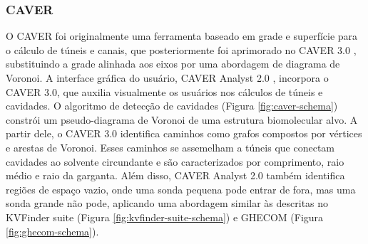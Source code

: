 \documentclass[Portugues]{phdquali}
\begin{document}
\subsubsection{CAVER}

O CAVER \cite{caver} foi originalmente uma ferramenta baseado em grade e superfície para o cálculo de túneis e canais, que posteriormente foi aprimorado no CAVER 3.0 \cite{caver3}, substituindo a grade alinhada aos eixos por uma abordagem de diagrama de Voronoi. A interface gráfica do usuário, CAVER Analyst 2.0 \cite{caveranalyst2}, incorpora o CAVER 3.0, que auxilia visualmente os usuários nos cálculos de túneis e cavidades. O algoritmo de detecção de cavidades (Figura \ref{fig:caver-schema}) constrói um pseudo-diagrama de Voronoi de uma estrutura biomolecular alvo. A partir dele, o CAVER 3.0 identifica caminhos como grafos compostos por vértices e arestas de Voronoi. Esses caminhos se assemelham a túneis que conectam cavidades ao solvente circundante e são caracterizados por comprimento, raio médio e raio da garganta. Além disso, CAVER Analyst 2.0 também identifica regiões de espaço vazio, onde uma sonda pequena pode entrar de fora, mas uma sonda grande não pode, aplicando uma abordagem similar às descritas no KVFinder suite (Figura \ref{fig:kvfinder-suite-schema}) e GHECOM (Figura \ref{fig:ghecom-schema}).
\end{document}
